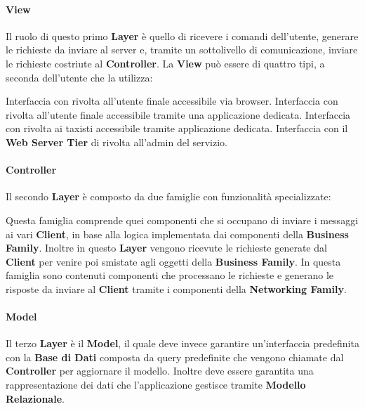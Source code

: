 \paragraph{View}
Il ruolo di questo primo \textbf{Layer} è quello di ricevere i comandi dell'utente, generare le richieste da inviare al server e, tramite un sottolivello di comunicazione, inviare le richieste costriute al \textbf{Controller}.
La \textbf{View} può essere di quattro tipi, a seconda dell'utente che la utilizza: 
\begin{itemize}
	 Interfaccia con \myTaxiService{} rivolta all'utente finale accessibile via browser.
	 Interfaccia con \myTaxiService{} rivolta all'utente finale accessibile tramite una applicazione dedicata.
	 Interfaccia con \myTaxiService{} rivolta ai taxisti accessibile tramite applicazione dedicata.
	 Interfaccia con il \textbf{Web Server Tier} di \myTaxiService{} rivolta all'admin del servizio.
\end{itemize}
\paragraph{Controller}
Il secondo \textbf{Layer} è composto da due famiglie con funzionalità specializzate:
\begin{itemize}
	Questa famiglia comprende quei componenti che si occupano di inviare i messaggi ai vari \textbf{Client}, in base alla logica implementata dai componenti della \textbf{Business Family}.
	Inoltre in questo \textbf{Layer} vengono ricevute le richieste generate dal \textbf{Client} per venire poi smistate agli oggetti della \textbf{Business Family}. 
	 In questa famiglia sono contenuti componenti che processano le richieste e generano le risposte da inviare al \textbf{Client} tramite i componenti della \textbf{Networking Family}. 
\end{itemize}
\paragraph{Model} 
Il terzo \textbf{Layer} è il \textbf{Model}, il quale deve invece garantire un'interfaccia predefinita con la \textbf{Base di Dati} composta da query predefinite che vengono chiamate dal \textbf{Controller} per aggiornare il modello. 
Inoltre deve essere garantita una rappresentazione dei dati che l'applicazione gestisce tramite \textbf{Modello Relazionale}.

